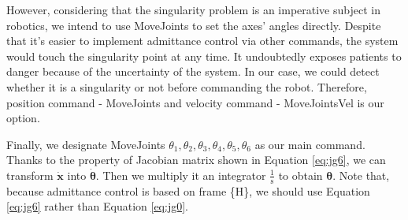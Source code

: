 \par
However, considering that the singularity problem is an imperative subject in robotics, we intend to use MoveJoints to set the axes' angles directly. Despite that it's easier to implement admittance control via other commands, the system would touch the singularity point at any time. It undoubtedly exposes patients to danger because of the uncertainty of the system. In our case, we could detect whether it is a singularity or not before commanding the robot. Therefore, position command - MoveJoints and velocity command - MoveJointsVel is our option. 
\par
Finally, we designate MoveJoints $\theta _1, \theta _2 ,\theta _3 ,\theta _4 ,\theta _5 , \theta _6 $ as our main command. Thanks to the property of Jacobian matrix shown in Equation \ref{eq:jg6}, we can transform $\boldsymbol{\dot{x}}$ into $\boldsymbol{\dot{\theta}}$. Then we multiply it an integrator $\frac{1}{\mathrm{s}}$
to obtain $\boldsymbol{\theta}$. Note that, because admittance control is based on frame \{H\}, we should use Equation \ref{eq:jg6} rather than Equation \ref{eq:jg0}. 
